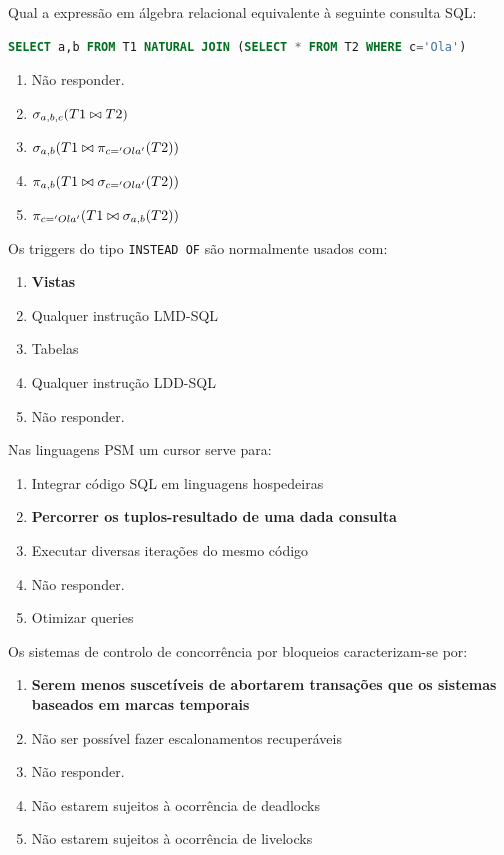 \documentclass[type=normal, year=2014/15]{bdad_exam}
\begin{document}
{\newpage
{}
Qual a expressão em álgebra relacional equivalente à seguinte consulta SQL:
\begin{lstlisting}[language=SQL]
SELECT a,b FROM T1 NATURAL JOIN (SELECT * FROM T2 WHERE c='Ola')
\end{lstlisting}
\begin{enumerate}[label=\alph*.]\itemsep0em
    \item Não responder.
    \item $\sigma_{a,b,c}(T1 \bowtie T2)$
    \item $\sigma_{a,b}(T1 \bowtie \pi_{c='Ola'}(T2))$
    \item \textbf{$\pi_{a,b}(T1 \bowtie \sigma_{c='Ola'}(T2))$ \greencheckmark}
    \item $\pi_{c='Ola'}(T1 \bowtie \sigma_{a,b}(T2))$
\end{enumerate}

Os triggers do tipo \texttt{INSTEAD OF} são normalmente usados com:
\begin{enumerate}[label=\alph*.]\itemsep0em
    \item \textbf{Vistas \greencheckmark}
    \item Qualquer instrução LMD-SQL
    \item Tabelas
    \item Qualquer instrução LDD-SQL
    \item Não responder.
\end{enumerate}

Nas linguagens PSM um cursor serve para:
\begin{enumerate}[label=\alph*.]\itemsep0em
    \item Integrar código SQL em linguagens hospedeiras
    \item \textbf{Percorrer os tuplos-resultado de uma dada consulta \greencheckmark}
    \item Executar diversas iterações do mesmo código
    \item Não responder.
    \item Otimizar queries
\end{enumerate}

Os sistemas de controlo de concorrência por bloqueios caracterizam-se por:
\begin{enumerate}[label=\alph*.]\itemsep0em
    \item \textbf{Serem menos suscetíveis de abortarem transações que os sistemas baseados em marcas temporais \greencheckmark}
    \item Não ser possível fazer escalonamentos recuperáveis
    \item Não responder.
    \item Não estarem sujeitos à ocorrência de deadlocks
    \item Não estarem sujeitos à ocorrência de livelocks
\end{enumerate}

}
\end{document}
